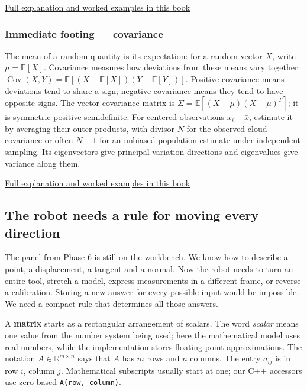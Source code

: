 \hyperref[02-foundations-ii-ch023-expected-values-describe-centers-covariance-describes-dependence]{Full explanation and worked examples in this book}

\subsubsection{Immediate footing --- covariance}\label{01-foundations-i-ch018-immediate-footing-covariance}

The mean of a random quantity is its expectation: for a random vector \(X\), write \(\mu=\mathbb{E}[X]\). Covariance measures how deviations from these means vary together: \(\operatorname{Cov}(X,Y)=\mathbb{E}[(X-\mathbb{E}[X])(Y-\mathbb{E}[Y])]\). Positive covariance means deviations tend to share a sign; negative covariance means they tend to have opposite signs. The vector covariance matrix is \(\Sigma=\mathbb{E}[(X-\mu)(X-\mu)^T]\); it is symmetric positive semidefinite. For centered observations \(x_i-\bar{x}\), estimate it by averaging their outer products, with divisor \(N\) for the observed-cloud covariance or often \(N-1\) for an unbiased population estimate under independent sampling. Its eigenvectors give principal variation directions and eigenvalues give variance along them.

\hyperref[02-foundations-ii-ch023-expected-values-describe-centers-covariance-describes-dependence]{Full explanation and worked examples in this book}

\subsection{The robot needs a rule for moving every direction}\label{01-foundations-i-ch018-the-robot-needs-a-rule-for-moving-every-direction}

The panel from Phase 6 is still on the workbench. We know how to describe a point, a displacement, a tangent and a normal. Now the robot needs to turn an entire tool, stretch a model, express measurements in a different frame, or reverse a calibration. Storing a new answer for every possible input would be impossible. We need a compact rule that determines all those answers.

A \textbf{matrix} starts as a rectangular arrangement of scalars. The word \emph{scalar} means one value from the number system being used; here the mathematical model uses real numbers, while the implementation stores floating-point approximations. The notation \(A\in\mathbb R^{m\times n}\) says that \(A\) has \(m\) rows and \(n\) columns. The entry \(a_{ij}\) is in row \(i\), column \(j\). Mathematical subscripts usually start at one; our C++ accessors use zero-based \texttt{A(row,\ column)}.

